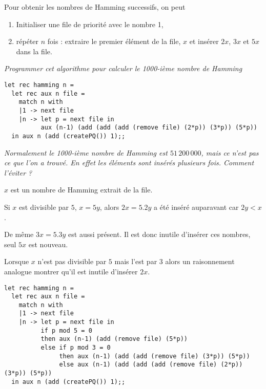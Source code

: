 Pour obtenir les nombres de Hamming successifs, on peut
\begin{enumerate}
\item Initialiser une file de priorité avec le nombre 1, 
\item répéter $n$ fois :
extraire le premier élément de la file, $x$ et insérer $2x$, $3x$ et $5x$ dans la file.
\end{enumerate}
\begin{Exercise}
{\it Programmer cet algorithme pour calculer le 1000-ième nombre de Hamming}
\end{Exercise}
\begin{Answer}
\begin{lstlisting}
let rec hamming n =
  let rec aux n file =
    match n with
    |1 -> next file
    |n -> let p = next file in
          aux (n-1) (add (add (add (remove file) (2*p)) (3*p)) (5*p))
  in aux n (add (createPQ()) 1);;  
\end{lstlisting}
\end{Answer}
\begin{Exercise}
{\it Normalement le 1000-ième nombre de Hamming est $51\,200\,000$, mais ce n'est pas ce que l'on a trouvé. En effet les éléments sont insérés plusieurs fois. Comment l'éviter ?}
\end{Exercise}
\begin{Answer}$x$ est un nombre de {\sc Hamming} extrait de la file.

Si $x$ est divisible par $5$, $x=5y$, alors $2x = 5.2y$ a été inséré auparavant car $2y < x$.

De même $3x = 5.3y$ est aussi présent. Il est donc inutile d'insérer ces nombres, seul $5x$ est nouveau. 

Lorsque $x$ n'est pas divisible par $5$ mais l'est par $3$ alors un raisonnement analogue montrer qu'il est inutile d'insérer $2x$.

\begin{lstlisting}
let rec hamming n =
  let rec aux n file =
    match n with
    |1 -> next file
    |n -> let p = next file in
          if p mod 5 = 0 
          then aux (n-1) (add (remove file) (5*p))
          else if p mod 3 = 0
               then aux (n-1) (add (add (remove file) (3*p)) (5*p))
               else aux (n-1) (add (add (add (remove file) (2*p)) (3*p)) (5*p))
  in aux n (add (createPQ()) 1);;
\end{lstlisting}
\end{Answer}

